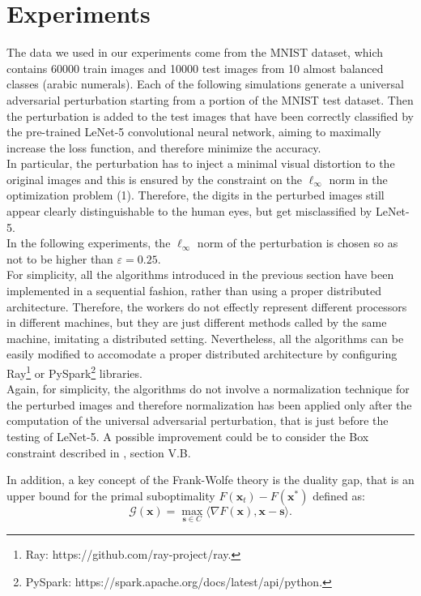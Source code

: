 \section{Experiments}
The data we used in our experiments come from the MNIST dataset, which contains 60000 train images and 10000 test images
from 10 almost balanced classes (arabic numerals). Each of the following simulations generate a universal adversarial perturbation
starting from a portion of the MNIST test dataset. Then the perturbation is added to the test images that have been correctly classified by the pre-trained LeNet-5 convolutional neural network, aiming to maximally increase the loss function, and therefore minimize the accuracy.\\
\indent In particular, the perturbation has to inject a minimal visual distortion to the original images and this is ensured by the constraint on the $\ell_{\infty}$ norm in the optimization problem (1). Therefore, the digits in the perturbed images still appear clearly distinguishable to the human eyes, but get misclassified by LeNet-5.\\
\indent 
In the following experiments, the $\ell_{\infty}$ norm of the perturbation is chosen so as not to be higher than $\varepsilon=0.25$.\\

For simplicity, all the algorithms introduced in the previous section have been implemented in a sequential fashion, rather than using a proper distributed architecture. Therefore, the workers do not effectly represent different processors in different machines, but they are just different methods called by the same machine, imitating a distributed setting. Nevertheless, all the algorithms can be easily modified to accomodate a proper distributed architecture by configuring Ray\footnote{Ray: https://github.com/ray-project/ray.} or PySpark\footnote{PySpark: https://spark.apache.org/docs/latest/api/python.} libraries.\\

Again, for simplicity, the algorithms do not involve a normalization technique for the perturbed images and therefore normalization has been applied only after the computation of the universal adversarial perturbation, that is just before the testing of LeNet-5. A possible improvement could be to consider the Box constraint described in \cite{A1}, section V.B.\indent

In addition, a key concept of the Frank-Wolfe theory is the duality gap, that is an upper bound for the primal suboptimality $F(\mathbf{x}_t)-F(\mathbf{x}^*)$ defined as:
\begin{equation}
	\mathcal{G}(\mathbf{x}) =\max_{\mathbf{s}\in\mathit{C}} \langle \nabla F(\mathbf{x}),\mathbf{x}-\mathbf{s}\rangle.
\end{equation}

